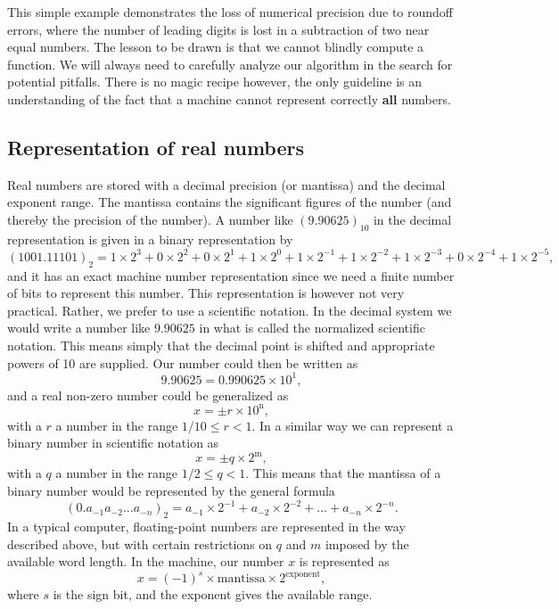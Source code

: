 This simple example demonstrates  the loss of numerical precision due
to roundoff errors, where the number of leading digits is lost 
in a subtraction of two near equal numbers. 
The lesson to be drawn is that we cannot blindly compute a function.
We will always need to carefully analyze our algorithm in the search for
potential pitfalls. There is no magic recipe however, the only guideline
is an understanding of the fact that a machine cannot represent
correctly {\bf all} numbers. 


\subsection{Representation of real numbers}

Real numbers are stored with a decimal precision (or mantissa)
and the decimal exponent range. The mantissa contains the significant
figures of the number (and thereby the precision of the number).
A number like $(9.90625)_{10}$ in the decimal representation is given 
in a binary representation by
\[
(1001.11101)_2=1\times2^3+0\times 2^2 +0\times 2^1+1\times 2^0+1\times 2^{-1}+1\times 2^{-2}+1\times 2^{-3}+0\times 2^{-4}+1\times 2^{-5},
\]
and it has an exact machine number representation since we need  a finite number
of bits to represent this number. 
This representation is however not very practical. Rather, we prefer to use a scientific 
notation.
In the decimal system we would write a number like $9.90625$ 
in what is called the normalized scientific notation. This means 
simply that the decimal point is shifted and appropriate powers
of 10 are supplied. Our number could then be written as
\[
  9.90625=0.990625\times 10^{1},
\]
and a real non-zero number could be generalized as
\[
    x=\pm r\times 10^{{\mathrm{n}}},
\]
with a $r$ a number in the range $1/10 \le r < 1$.
In a similar way we can represent a binary number in  
scientific notation as 
\[
    x=\pm q\times 2^{{\mathrm{m}}},
\]
with a $q$ a number in the range $1/2 \le q < 1$. 
This means that the mantissa of a binary number would be represented by
the general formula
\[
(0.a_{-1}a_{-2}\dots a_{-n})_2=a_{-1}\times 2^{-1}
+a_{-2}\times 2^{-2}+\dots+a_{-n}\times 2^{-n}.
\]
In a typical computer, floating-point numbers are represented
in the way described above, but with certain restrictions
on $q$ and $m$ imposed by the available word length. 
In the machine, our
number $x$ is represented as
%
\[
    x=(-1)^s\times {\mathrm{mantissa}}\times 2^{{\mathrm{exponent}}},
\]
%
where $s$ is the sign bit, and the exponent gives the available range.
